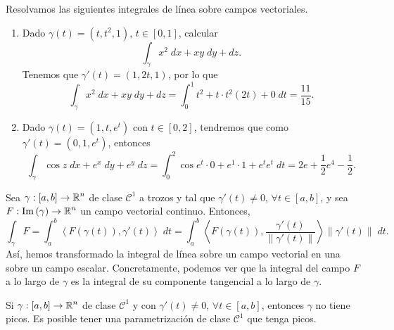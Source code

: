 \begin{eg}
Resolvamos las siguientes integrales de línea sobre campos vectoriales. 
\begin{enumerate}
	\item Dado $\displaystyle \gamma\left(t\right)=\left(t, t ^{2}, 1\right) $, $\displaystyle t \in \left[0,1\right]  $, calcular
		\[\int _{\gamma }x^{2} \; dx + xy \; dy + dz .\]
	Tenemos que $\displaystyle \gamma'\left(t\right)=\left(1, 2t, 1\right) $, por lo que 
	\[\int _{\gamma }x^{2} \; dx + xy \; dy + dz = \int^{1}_{0} t ^{2} + t \cdot t ^{2}\left(2t\right) + 0 \; dt = \frac{11}{15} .\]
\item Dado $\displaystyle \gamma\left(t\right)=\left(1, t, e^{t}\right) $ con $\displaystyle t \in \left[0, 2\right]  $, tendremos que como $\displaystyle \gamma'\left(t\right)=\left(0,1,e^{t}\right) $, entonces
	\[\int _{\gamma }\cos z \; dx + e^{x} \; dy + e^{y} \; dz = \int^{2}_{0} \cos e^{t} \cdot 0 + e^{1} \cdot 1 + e^{t} e^{t} \; dt = 2e+\frac{1}{2}e^{4}-\frac{1}{2} .\]
\end{enumerate}
\end{eg}
\begin{observation}
	Sea $\displaystyle \gamma:\left[a,b\right] \to \mathbb{R}^{n} $ de clase $\displaystyle \mathcal{C}^{1} $ a trozos y tal que $\displaystyle \gamma'\left(t\right)\neq 0 $, $\displaystyle \forall t \in \left[a,b\right]  $, y sea $\displaystyle F : \operatorname{Im}\left(\gamma \right)\to \mathbb{R}^{n} $ un campo vectorial continuo. Entonces, 
	\[\int _{\gamma }F =\int^{b}_{a} \left\langle F\left(\gamma\left(t\right)\right), \gamma'\left(t\right) \right\rangle  \; dt = \int^{b}_{a} \left\langle F\left(\gamma\left(t\right)\right), \frac{\gamma'\left(t\right)}{\|\gamma'\left(t\right)\|} \right\rangle \|\gamma'\left(t\right)\| \; dt .\]
	Así, hemos transformado la integral de línea sobre un campo vectorial en una sobre un campo escalar. Concretamente, podemos ver que la integral del campo $\displaystyle F $ a lo largo de $\displaystyle \gamma  $ es la integral de su componente tangencial a lo largo de $\displaystyle \gamma  $. 
\end{observation}
\begin{observation}
	Si $\displaystyle \gamma : \left[a,b\right] \to \mathbb{R}^{n} $ de clase $\displaystyle \mathcal{C}^{1} $ y con $\displaystyle \gamma'\left(t\right)\neq 0 $, $\displaystyle \forall t \in \left[a,b\right]  $, entonces $\displaystyle \gamma  $ no tiene picos. Es posible tener una parametrización de clase $\displaystyle \mathcal{C}^{1} $ que tenga picos.
\end{observation}
